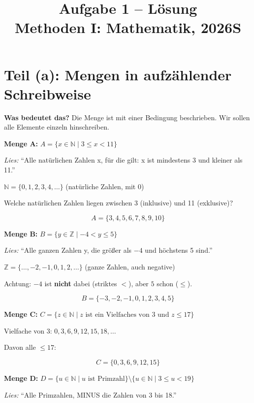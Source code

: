 \documentclass[12pt, a4paper]{article}
\title{\textbf{Aufgabe 1 -- Lösung} \\ Methoden I: Mathematik, 2026S}
\author{}
\date{}
\begin{document}
\maketitle

\section*{Teil (a): Mengen in aufzählender Schreibweise}

\textbf{Was bedeutet das?} Die Menge ist mit einer Bedingung beschrieben. Wir sollen alle Elemente einzeln hinschreiben.

\bigskip

\textbf{Menge A:} $A = \{x \in \mathbb{N} \mid 3 \leq x < 11\}$

\textit{Lies:} "`Alle natürlichen Zahlen x, für die gilt: x ist mindestens 3 und kleiner als 11."'

$\mathbb{N} = \{0, 1, 2, 3, 4, \ldots\}$ (natürliche Zahlen, mit 0)

Welche natürlichen Zahlen liegen zwischen 3 (inklusive) und 11 (exklusive)?

\[
    \boxed{A = \{3, 4, 5, 6, 7, 8, 9, 10\}}
\]

\bigskip

\textbf{Menge B:} $B = \{y \in \mathbb{Z} \mid -4 < y \leq 5\}$

\textit{Lies:} "`Alle ganzen Zahlen y, die größer als $-4$ und höchstens 5 sind."'

$\mathbb{Z} = \{\ldots, -2, -1, 0, 1, 2, \ldots\}$ (ganze Zahlen, auch negative)

Achtung: $-4$ ist \textbf{nicht} dabei (striktes $<$), aber $5$ schon ($\leq$).

\[
    \boxed{B = \{-3, -2, -1, 0, 1, 2, 3, 4, 5\}}
\]

\bigskip

\textbf{Menge C:} $C = \{z \in \mathbb{N} \mid z \text{ ist ein Vielfaches von 3 und } z \leq 17\}$

Vielfache von 3: $0, 3, 6, 9, 12, 15, 18, \ldots$

Davon alle $\leq 17$:

\[
    \boxed{C = \{0, 3, 6, 9, 12, 15\}}
\]

\bigskip

\textbf{Menge D:} $D = \{u \in \mathbb{N} \mid u \text{ ist Primzahl}\} \setminus \{u \in \mathbb{N} \mid 3 \leq u < 19\}$

\textit{Lies:} "`Alle Primzahlen, MINUS die Zahlen von 3 bis 18."'
\end{document}
